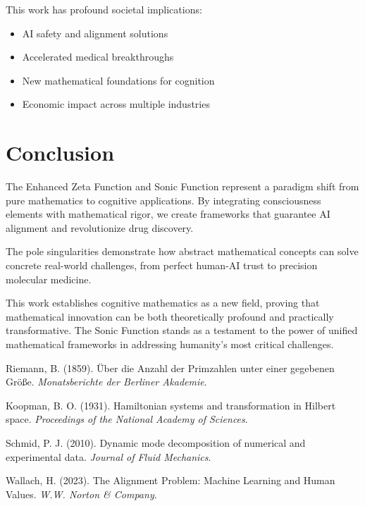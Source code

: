 \documentclass[12pt,a4paper]{article}
\begin{document}
This work has profound societal implications:
\begin{itemize}
\item AI safety and alignment solutions
\item Accelerated medical breakthroughs
\item New mathematical foundations for cognition
\item Economic impact across multiple industries
\end{itemize}

\section{Conclusion}

The Enhanced Zeta Function and Sonic Function represent a paradigm shift from pure mathematics to cognitive applications. By integrating consciousness elements with mathematical rigor, we create frameworks that guarantee AI alignment and revolutionize drug discovery.

The pole singularities demonstrate how abstract mathematical concepts can solve concrete real-world challenges, from perfect human-AI trust to precision molecular medicine.

This work establishes cognitive mathematics as a new field, proving that mathematical innovation can be both theoretically profound and practically transformative. The Sonic Function stands as a testament to the power of unified mathematical frameworks in addressing humanity's most critical challenges.

\begin{thebibliography}{99}

Riemann, B. (1859). Über die Anzahl der Primzahlen unter einer gegebenen Größe. \textit{Monatsberichte der Berliner Akademie}.

Koopman, B. O. (1931). Hamiltonian systems and transformation in Hilbert space. \textit{Proceedings of the National Academy of Sciences}.

Schmid, P. J. (2010). Dynamic mode decomposition of numerical and experimental data. \textit{Journal of Fluid Mechanics}.

Wallach, H. (2023). The Alignment Problem: Machine Learning and Human Values. \textit{W.W. Norton \& Company}.

\end{thebibliography}

\appendix
\end{document}
